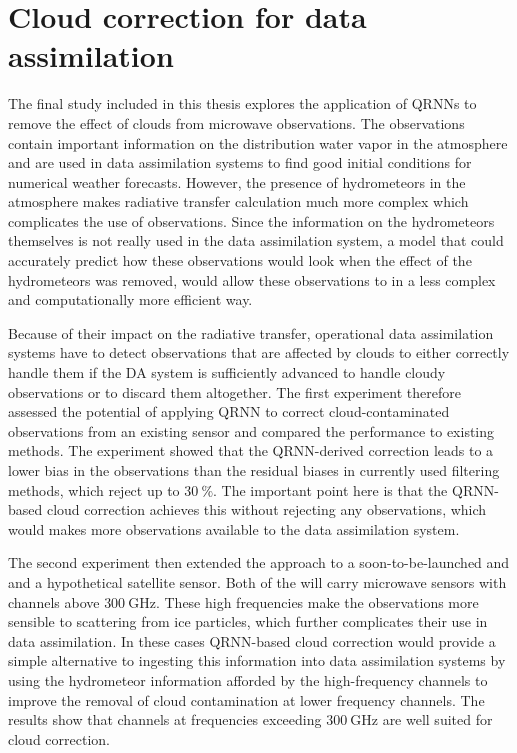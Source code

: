 {\section{Cloud correction for data assimilation}

The final study included in this thesis explores the application of QRNNs to
remove the effect of clouds from microwave observations. The observations
contain important information on the distribution water vapor in the atmosphere
and are used in data assimilation systems to find good initial conditions for
numerical weather forecasts. However, the presence of hydrometeors in the
atmosphere makes radiative transfer calculation much more complex which
complicates the use of observations. Since the information on the hydrometeors
themselves is not really used in the data assimilation system, a model that
could accurately predict how these observations would look when the effect of
the hydrometeors was removed, would allow these observations to in a less
complex and computationally more efficient way.

Because of their impact on the radiative transfer, operational data assimilation
systems have to detect observations that are affected by clouds to either
correctly handle them if the DA system is sufficiently advanced to handle cloudy
observations or to discard them altogether. The first experiment therefore
assessed the potential of applying QRNN to correct cloud-contaminated
observations from an existing sensor and compared the performance to existing
methods. The experiment showed that the QRNN-derived correction leads to a lower
bias in the observations than the residual biases in currently used filtering
methods, which reject up to $\SI{30}{\percent}$. The important point here is that the QRNN-based
cloud correction achieves this without rejecting any observations, which would
makes more observations available to the data assimilation system.

The second experiment then extended the approach to a soon-to-be-launched and
and a hypothetical satellite sensor. Both of the will carry microwave sensors
with channels above $\SI{300}{\giga \hertz}$. These high frequencies make the
observations more sensible to scattering from ice particles, which further
complicates their use in data assimilation. In these cases QRNN-based cloud
correction would provide a simple alternative to ingesting this information into
data assimilation systems by using the hydrometeor information afforded by the
high-frequency channels to improve the removal of cloud contamination at lower
frequency channels. The results show that channels at frequencies exceeding
$\SI{300}{\giga \hertz}$ are well suited for cloud correction.

}
